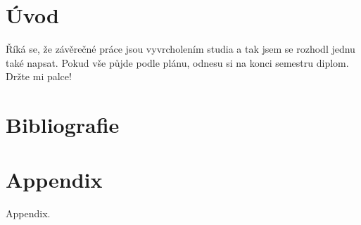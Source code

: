 \documentclass[digital, twoside, table, lot]{fithesis3}
\begin{document}
\chapter*{Úvod}

Říká se, že závěrečné práce jsou vyvrcholením studia a tak jsem se
rozhodl jednu také napsat. Pokud vše půjde podle plánu, odnesu si
na konci semestru diplom. Držte mi palce!

\chapter{Bibliografie}
\printbibliography[heading=bibintoc]

\appendix
\chapter{Appendix}
Appendix.
\end{document}
